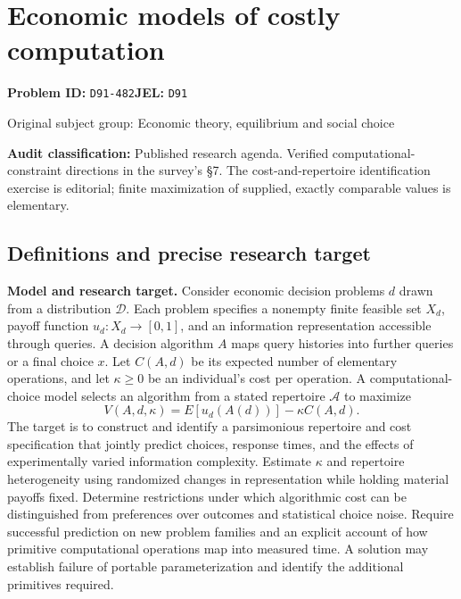 \documentclass[11pt,a4paper]{article}
\begin{document}
\section*{Economic models of costly computation}
\textbf{Problem ID:} \texttt{D91-482}\quad \textbf{JEL:} \texttt{D91}\par
\label{problem:OP-0275}
{\sffamily\small\color{muted}Original subject group: Economic theory, equilibrium and social choice\par}
\label{definitions:problem:30007556}
\textbf{Audit classification:} Published research agenda. Verified computational-constraint directions in the survey’s §7. The cost-and-repertoire identification exercise is editorial; finite maximization of supplied, exactly comparable values is elementary.
\subsection*{Definitions and precise research target}
\textbf{Model and research target.} Consider economic decision problems \(d\) drawn from a distribution \(\mathcal D\). Each problem specifies a nonempty finite feasible set \(X_d\), payoff function \(u_d:X_d\to[0,1]\), and an information representation accessible through queries. A decision algorithm \(A\) maps query histories into further queries or a final choice \(x\). Let \(C(A,d)\) be its expected number of elementary operations, and let \(\kappa\geq0\) be an individual's cost per operation. A computational-choice model selects an algorithm from a stated repertoire \(\mathcal A\) to maximize
\[
 V(A,d,\kappa)=E[u_d(A(d))]-\kappa C(A,d).
\]
The target is to construct and identify a parsimonious repertoire and cost specification that jointly predict choices, response times, and the effects of experimentally varied information complexity. Estimate \(\kappa\) and repertoire heterogeneity using randomized changes in representation while holding material payoffs fixed. Determine restrictions under which algorithmic cost can be distinguished from preferences over outcomes and statistical choice noise. Require successful prediction on new problem families and an explicit account of how primitive computational operations map into measured time. A solution may establish failure of portable parameterization and identify the additional primitives required.
\end{document}

